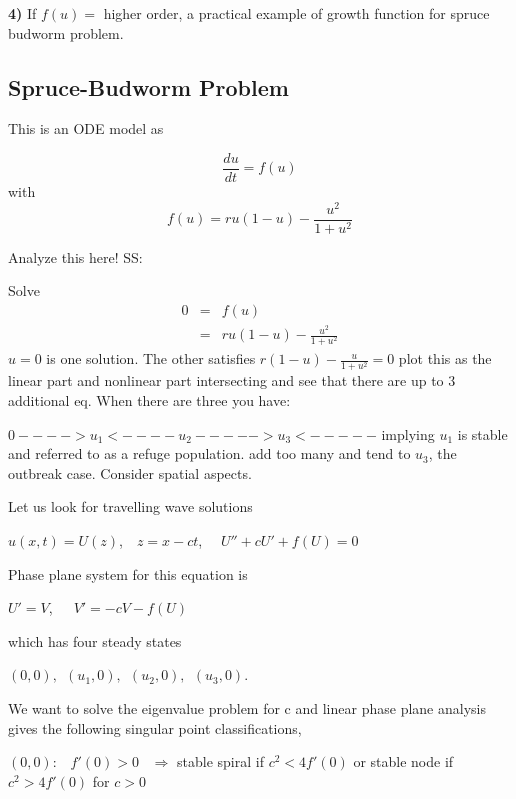 \documentclass[]{article}
\numberwithin{equation}{section}		%
\def\bea{\begin{eqnarray}}
\def\ena{\end{eqnarray}}
\begin{document}
{\bf 4)} If $f(u)=$ higher order, a practical example of growth function for spruce budworm problem.


\subsection{Spruce-Budworm Problem}
This is an ODE model as

\begin{equation}
\frac{du}{dt}=f(u)
\end{equation}
with
\begin{equation}
f(u)=ru(1-u)-\frac{u^2}{1+u^2}
\end{equation}

Analyze this here!
SS:

Solve 
\bea
0 &=& f(u) \nonumber \\
&=& ru(1-u)-\frac{u^2}{1+u^2} \nonumber
\ena
$u=0$ is one solution. The other satisfies $r(1-u)-\frac{u}{1+u^2}=0$
plot this as the linear part and nonlinear part intersecting and see that there are up to 3 additional eq. When there are three you have:

$0 ---->u_1<----u_2----->u_3<-----$ implying $u_1$ is stable and referred to as a refuge population. add too many and tend to $u_3$, the outbreak case. Consider spatial aspects.

\noindent Let us look for travelling wave solutions

\begin{center}
$u(x, t) = U(z)$,\ \ $ z = x - ct $, \ \ $ U''+cU'+ f (U) = 0$\\
\end{center}

\noindent Phase plane system for this equation is

\begin{center}
$U'= V$,\ \ \ $ V'=-cV - f (U)$ \\
\end{center}

\noindent which has four steady states

\begin{center}
$(0, 0),\ \  (u_1, 0),\ \  (u_2, 0),\ \  (u_3, 0)$.\\
\end{center}

We want to solve the eigenvalue problem for c and linear phase plane analysis gives the following singular point classifications,

$(0,0):$ \ $ f'(0)> 0 $ \ $ \Rightarrow$ stable spiral if $c^2<4 f'(0)$ or stable node if $c^2> 4f'(0)$ for $c>0$
\end{document}
